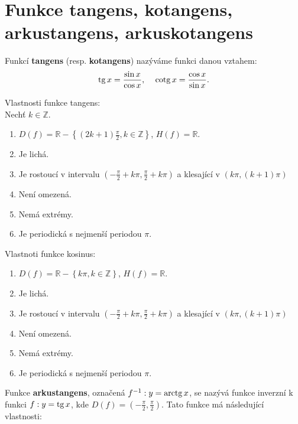 \section{Funkce tangens, kotangens, arkustangens, arkuskotangens}
\begin{definition}
  Funkcí \textbf{tangens} (resp. \textbf{kotangens}) nazýváme funkci danou vztahem:
  \begin{align*}
    \tg x = \frac{\sin x}{\cos x}, & & \cotg x = \frac{\cos x}{\sin x}.
  \end{align*}
\end{definition}

\begin{veta}
    Vlastnosti funkce tangens:\\
    Nechť $k\in \mathbb Z.$
    \begin{enumerate}[$i.$]
        \item $D(f)= \mathbb R-\left \{ (2k+1)\frac{\pi}{2}, k\in \mathbb Z \right \} $, $H(f)= \mathbb R $.
       	\item Je lichá.
        \item Je rostoucí v intervalu $\left ( -\frac{\pi}{2}+k\pi, \frac{\pi}{2}+k\pi \right ) $
        a klesající v $\left ( k\pi, (k+1)\pi \right ) $
        \item Není omezená.
        \item Nemá extrémy.
        \item Je periodická s nejmenší periodou $\pi.$
    \end{enumerate}
    Vlastnoti funkce kosinus:
    \begin{enumerate}[$i.$]
        \item $D(f)= \mathbb R-\left \{ k\pi, k\in \mathbb Z \right \} $, $H(f)= \mathbb R $.
       	\item Je lichá.
        \item Je rostoucí v intervalu $\left ( -\frac{\pi}{2}+k\pi, \frac{\pi}{2}+k\pi \right ) $
        a klesající v $\left ( k\pi, (k+1)\pi \right ) $
        \item Není omezená.
        \item Nemá extrémy.
        \item Je periodická s nejmenší periodou $\pi.$
    \end{enumerate}
\end{veta}


\begin{definition}[Arkustangens]
  Funkce \textbf{arkustangens}, označená $f^{-1}: y=\operatorname{arctg} x$, se nazývá funkce inverzní k funkci $f: y=\operatorname{tg} x$, kde $D(f)=\left ( -\frac{\pi}{2}, \frac{\pi}{2} \right )$. Tato funkce má následující vlastnosti:
\end{definition}

